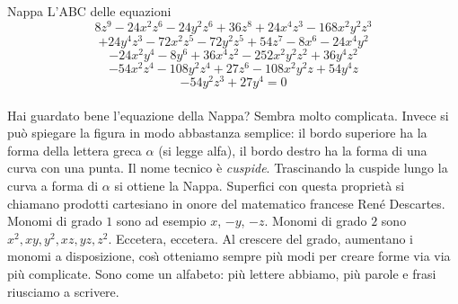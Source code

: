 \begin{surferPage}{Nappa}
L'ABC delle equazioni
  \smallskip
\[8z^9-24x^2z^6-24y^2z^6+36z^8+24x^4z^3-168x^2y^2z^3\]
\[+24y^4z^3-72x^2z^5-72y^2z^5+54z^7-8x^6-24x^4y^2\]
\[-24x^2y^4-8y^6 + 36x^4z^2-252x^2y^2z^2+36y^4z^2\]
\[- 54x^2z^4-108y^2z^4 + 27z^6-108x^2y^2z + 54y^4z\]
\[-54y^2z^3 + 27y^4 = 0\]\\
\vspace{0.3cm}
Hai guardato bene l'equazione della Nappa? Sembra molto complicata.
Invece si pu\`o spiegare la figura in modo abbastanza semplice: il bordo superiore ha la forma della lettera greca $\alpha$ (si legge alfa), il bordo destro ha la forma di una curva con una punta. Il nome tecnico \`e {\it cuspide}. Trascinando la cuspide lungo la curva a forma di $\alpha$ si ottiene la Nappa. Superfici con questa propriet\`a si chiamano prodotti cartesiano in onore del matematico francese Ren\'e Descartes.\\
\vspace{0.3cm}
Monomi di grado $1$ sono ad esempio $x$, $-y$, $-z$. Monomi di grado $2$ sono $x^2, xy, y^2, xz, yz, z^2$. Eccetera, eccetera. Al crescere del grado, aumentano i monomi a disposizione, cos\`{\i} otteniamo sempre pi\`u modi per creare forme via via pi\`u complicate. Sono come un alfabeto: pi\`u lettere abbiamo, pi\`u parole e frasi riusciamo a scrivere.
\end{surferPage}
